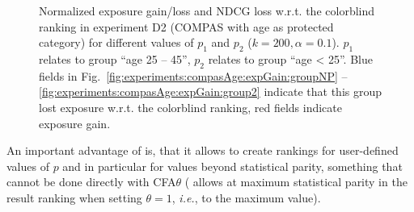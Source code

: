 \begin{figure}[t!]
	\vspace{-3mm}
	\caption{Normalized exposure gain/loss and NDCG loss w.r.t. the colorblind ranking in experiment D2 (COMPAS with age as protected category) for different values of $p_1$ and $p_2$ ($k=200, \alpha=0.1$).
		$p_1$ relates to group ``age 25 -- 45'', $p_2$ relates to group ``age < 25''.
		Blue fields in Fig.~\ref{fig:experiments:compasAge:expGain:groupNP} -- \ref{fig:experiments:compasAge:expGain:group2} indicate that this group lost exposure w.r.t. the colorblind ranking, red fields indicate exposure gain.
	}
	\label{fig:results-moving-p}
\end{figure}
%
%
An important advantage of \algoFAIR is, that it allows to create rankings for user-defined values of $p$ and in particular for values beyond statistical parity, something that cannot be done directly with CFA$\theta$ (\citet{zehlike2020matching} allows at maximum statistical parity in the result ranking when setting $\theta=1$, {\it i.e.}, to the maximum value).

